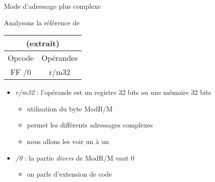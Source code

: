 \documentclass[14pt,xcolor,table]{beamer}
\begin{document}
\begin{frame}[fragile]{Mode d'adressage plus complexe}

	Analysons la référence de 

	\begin{center}
	\begin{small}
	\begin{tabular}{|c|c|}
		\multicolumn{2}{c}{\asm{INC} (extrait)}\\\hline
		{\cellcolor{gray!25}Opcode} & {\cellcolor{gray!25}Opérandes} \\\hline
		FF /0 & r/m32\\\hline
	\end{tabular}
	\end{small}
	\end{center}
	
	\begin{itemize}
	\item 
		\emph{r/m32} : l'opérande est un registre 32 bits ou une mémoire 32 bits
		\begin{itemize}
		\item utilisation du byte ModR/M
		\item permet les différents adressages complexes
		\item nous allons les voir un à un
		\end{itemize}
	\item 
		\emph{/0} : la partie \textit{divers} de ModR/M vaut 0
		\begin{itemize}
		\item on parle d'extension de code
		\end{itemize}
	\end{itemize}	
	
\end{frame}
\end{document}
